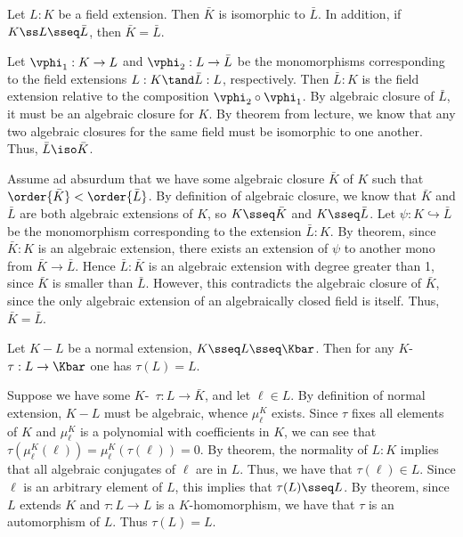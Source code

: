 \documentclass{article}
\begin{document}
\begin{exercise} %
  Let \( L:K \) be a field extension. Then \( \bar K \) is isomorphic to \( \bar L \).
  In addition, if \( K\ss L \sseq \bar L \), then \( \bar K = \bar L \).
\end{exercise}
\begin{solution}
  Let \( \vphi_1:K\to L \) and \( \vphi_2:L\to \bar L \) be the monomorphisms corresponding to the field extensions \( L:K \tand \bar L:L \), respectively.
  Then \( \bar L:K \) is the field extension relative to the composition \( \vphi_2\circ \vphi_1 \).
  By algebraic closure of \( \bar L \), it must be an algebraic closure for \( K \).
  By theorem from lecture, we know that any two algebraic closures for the same field must be isomorphic to one another.
  Thus, \( \bar L\iso \bar K \).

  Assume ad absurdum that we have some algebraic closure \( \bar K \) of \( K \) such that \( \order{\bar K} < \order{\bar L} \).
  By definition of algebraic closure, we know that \( \bar K \) and \( \bar L \) are both algebraic extensions of \( K \), so \( K\sseq \bar K \) and \( K\sseq \bar L \).
  Let \( \psi:K\hookrightarrow\bar L \) be the monomorphism corresponding to the extension \( \bar L:K \).
  By theorem, since \( \bar K:K \) is an algebraic extension, there exists an extension of \( \psi \) to another mono from \( \bar K \to \bar L \).
  Hence \( \bar L:\bar K \) is an algebraic extension with degree greater than 1, since \( \bar K \) is smaller than \( \bar L \).
  However, this contradicts the algebraic closure of \( \bar K \), since the only algebraic extension of an algebraically closed field is itself.
  Thus, \( \bar K = \bar L \).
\end{solution}

\begin{exercise} %
  Let \( K-L \) be a normal extension, \( K\sseq L\sseq \Kbar \).
  Then for any \( K \)-\homo~\( \tau:L\to \Kbar \) one has \( \tau(L) = L \).
\end{exercise}
\begin{solution}
  Suppose we have some \( K \)-\homo~\( \tau:L\to\bar K \), and let \( \ell\in L \).
  By definition of normal extension, \( K-L \) must be algebraic, whence \( \mu_\ell^K \) exists.
  Since \( \tau \) fixes all elements of \( K \) and \( \mu_\ell^K \) is a polynomial with coefficients in \( K \), we can see that \( \tau(\mu_\ell^K(\ell)) = \mu_\ell^K(\tau(\ell)) = 0 \).
  By theorem, the normality of \( L:K \) implies that all algebraic conjugates of \( \ell \) are in \( L \).
  Thus, we have that \( \tau(\ell)\in L \).
  Since \( \ell \) is an arbitrary element of \( L \), this implies that \( \tau(L) \sseq L \).
  By theorem, since \( L \) extends \( K \) and \( \tau:L\to L \) is a \( K \)-homomorphism, we have that \( \tau \) is an automorphism of \( L \).
  Thus \( \tau(L) = L \).
\end{solution}
\end{document}
